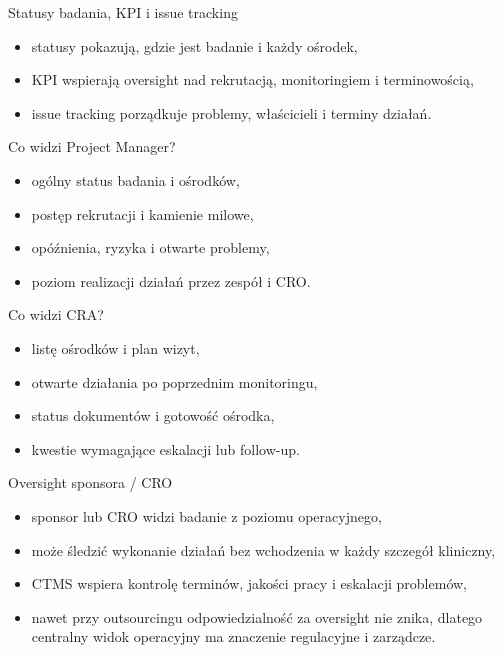 \begin{frame}{Statusy badania, KPI i issue tracking}
  \begin{itemize}
    \item statusy pokazują, gdzie jest badanie i każdy ośrodek,
    \item KPI wspierają oversight nad rekrutacją, monitoringiem i terminowością,
    \item issue tracking porządkuje problemy, właścicieli i terminy działań.
  \end{itemize}
\end{frame}

\begin{frame}{Co widzi Project Manager?}
  \begin{itemize}
    \item ogólny status badania i ośrodków,
    \item postęp rekrutacji i kamienie milowe,
    \item opóźnienia, ryzyka i otwarte problemy,
    \item poziom realizacji działań przez zespół i CRO.
  \end{itemize}
\end{frame}

\begin{frame}{Co widzi CRA?}
  \begin{itemize}
    \item listę ośrodków i plan wizyt,
    \item otwarte działania po poprzednim monitoringu,
    \item status dokumentów i gotowość ośrodka,
    \item kwestie wymagające eskalacji lub follow-up.
  \end{itemize}
\end{frame}

\begin{frame}{Oversight sponsora / CRO}
  \begin{itemize}
    \item sponsor lub CRO widzi badanie z poziomu operacyjnego,
    \item może śledzić wykonanie działań bez wchodzenia w każdy szczegół kliniczny,
    \item CTMS wspiera kontrolę terminów, jakości pracy i eskalacji problemów,
    \item nawet przy outsourcingu odpowiedzialność za oversight nie znika, dlatego centralny widok operacyjny ma znaczenie regulacyjne i zarządcze.
  \end{itemize}
\end{frame}

